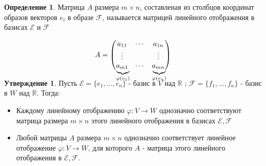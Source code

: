 \documentclass[a4paper, 12pt]{article}
\newcommand{\R}{\mathbb R}
\renewcommand{\phi}{\varphi}
\newcommand\undermat[2]{\makebox[0pt][l]{$\smash{\underbrace
{\phantom{\begin{matrix}#2\end{matrix}}}_{\text{$#1$}}}$}#2}
\theoremstyle{definition}
\newtheorem*{definition}{Определение}
\newtheorem*{subtheorem}{Утверждение}
\begin{document}
  \begin{definition}
    Матрица $A$ размера $m \times n$,  составленая из столбцов координат образов векторов $e_i$ в образе $\mathcal{F}$, называется матрицей линейного отображения в базисах $\mathcal{E} $ и $\mathcal{F}$  
  \end{definition} 
  $$A = \begin{pmatrix}
    a_{11} & \cdots & a_{1n} \\
    \vdots & \null & \vdots \\
    \undermat{\phi(e_1)}{a_{m1}}  & \cdots & \undermat{\phi(e_n)}{a_{mn}} 
  \end{pmatrix}$$  
  \vspace{0.3cm}
  \begin{subtheorem}
    Пусть $\mathcal{E}  = \{e_1,...,e_n\}$ - базис в $V$ над $\R$ ; $\mathcal{F}  = \{f_1,...,f_n\}$ - базис в $W$ над $\R$. Тогда:
    \begin{itemize}
      \item Каждому линейному отображению $\phi: V \to W$ однозначно соответствуют матрица размера $m \times n$ этого линейного отображения в базисах $\mathcal{E}, \mathcal{F}$
      \item Любой матрицы $A$ размера $m \times n$ однозначно соответствует линейное отображение $\phi: V \to W$, для которого $A$ - матрица этого линейного отображения в $\mathcal{E}, \mathcal{F}$.
    \end{itemize}
  \end{subtheorem} 
\end{document}
